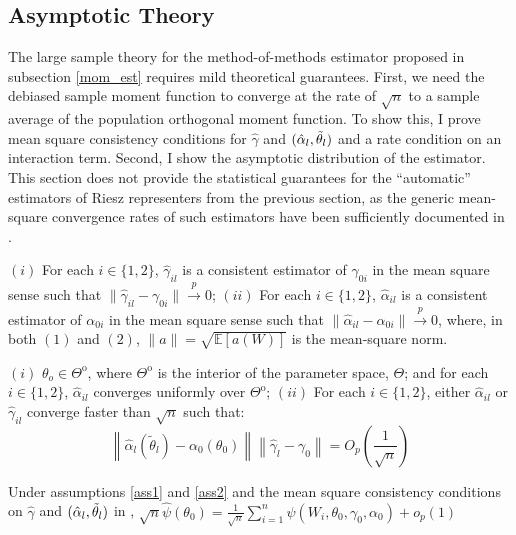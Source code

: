 \subsection{Asymptotic Theory}
The large sample theory for the method-of-methods estimator proposed in subsection \ref{mom_est} requires mild theoretical guarantees. First, we need the debiased sample moment function to converge at the rate of $\sqrt{n}$ to a sample average of the population orthogonal moment function. To show this, I prove mean square consistency conditions for $\hat{\gamma}$ and $(\hat{\alpha}_l, \Tilde{\theta}_l)$ and a rate condition on an interaction term. Second, I show the asymptotic distribution of the estimator. This section does not provide the statistical guarantees for the \enquote{automatic} estimators of Riesz representers from the previous section, as the generic mean-square convergence rates of such estimators have been sufficiently documented in \citet{chernozhukov2022automatic}. 


\begin{assumption}  \label{ass1}
 $(i)$ For each $i \in \{1,2\}$, $\hat{\gamma}_{i l}$ is a consistent estimator of ${\gamma_{0 i}}$ in the mean square sense such that $ \|\hat{\gamma}_{il}-\gamma_{0 i} \| \overset{p}{\to} 0$; $(ii)$ For each $i \in \{1,2\}$, $\hat{\alpha}_{i l}$ is a consistent estimator of ${\alpha_{0 i}}$ in the mean square sense such that $\|\hat{\alpha}_{i l}-\alpha_{0 i} \| \overset{p}{\to} 0$, where, in both $(1)$ and $(2)$, $\|a\|=\sqrt{\mathbb{E}[a(W)]}$ is the mean-square norm.
\end{assumption}

\begin{assumption}  \label{ass2}
$(i)$ $\theta_o \in \Theta^\mathrm{o}$, where $\Theta^\mathrm{o}$ is the interior of the parameter space, $\Theta$; and for each $i \in \{1,2\}$, $\hat{\alpha}_{il}$ converges uniformly over $\Theta^\mathrm{o}$; $(ii)$ For each $i \in \{1,2\}$, either $\hat{\alpha}_{il}$ or $\hat{\gamma}_{il}$ converge faster than $\sqrt{n}$ such that:
 \[\left\|\hat{\alpha}_l\left(\tilde{\theta}_l\right)-\alpha_0\left(\theta_0\right)\right\|\left\|\hat{\gamma}_l-\gamma_0\right\|  =O_p\left(\frac{1}{\sqrt{n}}\right)\]
\end{assumption}

\begin{theorem} \label{thm1}
 Under assumptions \ref{ass1}  and \ref{ass2} and the mean square consistency conditions on $\hat{\gamma}$ and $(\hat{\alpha}_l, \Tilde{\theta}_l)$ in \citet{chernozhukov2022locally}, $\sqrt{n} \hat{\psi}\left(\theta_0\right)=\frac{1}{\sqrt{n}} \sum_{i=1}^n \psi\left(W_i, \theta_0, \gamma_0, \alpha_0\right)+o_p(1)$ 
\end{theorem}

